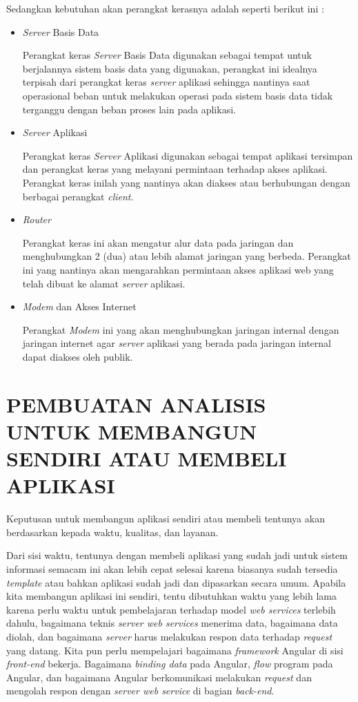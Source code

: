 \documentclass[pdftex,12pt, oneside]{article}
\begin{document}
Sedangkan kebutuhan akan perangkat kerasnya adalah seperti berikut ini :

\begin{itemize}
	\item \textit{Server} Basis Data
	
Perangkat keras \textit{Server} Basis Data digunakan sebagai tempat untuk berjalannya sistem basis data yang digunakan, perangkat ini idealnya terpisah dari perangkat keras \textit{server} aplikasi sehingga nantinya saat operasional beban untuk melakukan operasi pada sistem basis data tidak terganggu dengan beban proses lain pada aplikasi.
	
	\item \textit{Server} Aplikasi
	
Perangkat keras \textit{Server} Aplikasi digunakan sebagai tempat aplikasi tersimpan dan perangkat keras yang melayani permintaan terhadap akses aplikasi. Perangkat keras inilah yang nantinya akan diakses atau berhubungan dengan berbagai perangkat \textit{client}.
	
	\item \textit{Router}
	
Perangkat keras ini akan mengatur alur data pada jaringan dan menghubungkan 2 (dua) atau lebih alamat jaringan yang berbeda. Perangkat ini yang nantinya akan mengarahkan permintaan akses aplikasi web yang telah dibuat ke alamat \textit{server} aplikasi.
	
	\item \textit{Modem} dan Akses Internet	
	
Perangkat \textit{Modem} ini yang akan menghubungkan jaringan internal dengan jaringan internet agar \textit{server} aplikasi yang berada pada jaringan internal dapat diakses oleh publik.	
	
\end{itemize}

\section{PEMBUATAN ANALISIS UNTUK MEMBANGUN SENDIRI ATAU MEMBELI APLIKASI}

Keputusan untuk membangun aplikasi sendiri atau membeli tentunya akan berdasarkan kepada waktu, kualitas, dan layanan. 

Dari sisi waktu, tentunya dengan membeli aplikasi yang sudah jadi untuk sistem informasi semacam ini akan lebih cepat selesai karena biasanya sudah tersedia \textit{template} atau bahkan aplikasi sudah jadi dan dipasarkan secara umum. Apabila kita membangun aplikasi ini sendiri, tentu dibutuhkan waktu yang lebih lama karena perlu waktu untuk pembelajaran terhadap model \textit{web services} terlebih dahulu, bagaimana teknis \textit{server web services} menerima data, bagaimana data diolah, dan bagaimana \textit{server} harus melakukan respon data terhadap \textit{request} yang datang. Kita pun perlu mempelajari bagaimana \textit{framework} Angular di sisi \textit{front-end} bekerja. Bagaimana \textit{binding data} pada Angular, \textit{flow} program pada Angular, dan bagaimana Angular berkomunikasi melakukan \textit{request} dan mengolah respon dengan \textit{server web service} di bagian \textit{back-end}.
\end{document}
